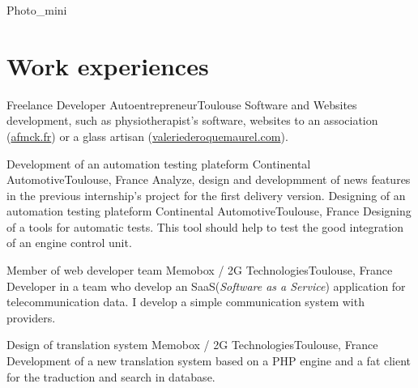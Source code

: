 \documentclass{my_cv_bis}
\begin{document}
 {
}{Photo_mini}

\section{Work experiences}
	{Freelance Developer}
	{Autoentrepreneur}{Toulouse}
	{
	Software and Websites development, such as physiotherapist's software, websites to an association (\url{afmck.fr}) or a glass artisan
	(\url{valeriederoquemaurel.com}). 
	}
	{}

	{Development of an automation testing plateform}
	{Continental Automotive}{Toulouse, France}
	{
	Analyze, design and developmment of news features in the previous internship's project for the first delivery version. 
	}
	{}
	{Designing of an automation testing plateform}
	{Continental Automotive}{Toulouse, France}
	{
	Designing of a tools for automatic tests. This tool should help to test the good integration of an engine control unit.
	}
	{}

	{Member of web developer team}
	{Memobox / 2G Technologies}{Toulouse, France}
	{Developer in a team who develop an SaaS(\textit{Software as a Service}) application for telecommunication data. I develop a
	simple communication system with providers.} {}

	{ Design of translation system}
	{Memobox / 2G Technologies}{Toulouse, France}
	{
	Development of a new translation system based on a PHP engine and a fat client for the traduction and search in database.	} {}
\end{document}

